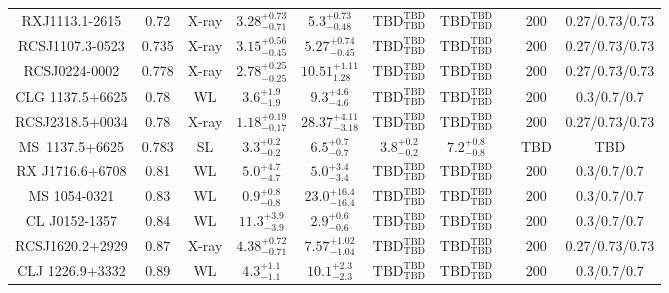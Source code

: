 \begin{table}
\begin{tabular}{cccccccccc}
RXJ1113.1-2615 & 0.72 & X-ray & ${3.28}^{+0.73}_{-0.71}$ & ${5.3}^{+0.73}_{-0.48}$ & ${\mathrm{TBD}}^{\mathrm{TBD}}_{\mathrm{TBD}}$ & ${\mathrm{TBD}}^{\mathrm{TBD}}_{\mathrm{TBD}}$ & \citet{BA14.1} & 200 & 0.27/0.73/0.73 \\
RCSJ1107.3-0523 & 0.735 & X-ray & ${3.15}^{+0.56}_{-0.45}$ & ${5.27}^{+0.74}_{-0.45}$ & ${\mathrm{TBD}}^{\mathrm{TBD}}_{\mathrm{TBD}}$ & ${\mathrm{TBD}}^{\mathrm{TBD}}_{\mathrm{TBD}}$ & \citet{BA14.1} & 200 & 0.27/0.73/0.73 \\
RCSJ0224-0002 & 0.778 & X-ray & ${2.78}^{+0.25}_{-0.25}$ & ${10.51}^{+1.11}_{1.28}$ & ${\mathrm{TBD}}^{\mathrm{TBD}}_{\mathrm{TBD}}$ & ${\mathrm{TBD}}^{\mathrm{TBD}}_{\mathrm{TBD}}$ & \citet{BA14.1} & 200 & 0.27/0.73/0.73 \\
CLG 1137.5+6625 & 0.78 & WL & ${3.6}^{+1.9}_{-1.9}$ & ${9.3}^{+4.6}_{-4.6}$ & ${\mathrm{TBD}}^{\mathrm{TBD}}_{\mathrm{TBD}}$ & ${\mathrm{TBD}}^{\mathrm{TBD}}_{\mathrm{TBD}}$ & \citet{SE14.1} & 200 & 0.3/0.7/0.7 \\
RCSJ2318.5+0034 & 0.78 & X-ray & ${1.18}^{+0.19}_{-0.17}$ & ${28.37}^{+4.11}_{-3.18}$ & ${\mathrm{TBD}}^{\mathrm{TBD}}_{\mathrm{TBD}}$ & ${\mathrm{TBD}}^{\mathrm{TBD}}_{\mathrm{TBD}}$ & \citet{BA14.1} & 200 & 0.27/0.73/0.73 \\
MS~1137.5+6625 & 0.783 & SL & ${3.3}^{+0.2}_{-0.2}$ & ${6.5}^{+0.7}_{-0.7}$ & ${3.8}^{+0.2}_{-0.2}$ & ${7.2}^{+0.8}_{-0.8}$ & \citet{CO07.1} & TBD & TBD \\
RX J1716.6+6708 & 0.81 & WL & ${5.0}^{+4.7}_{-4.7}$ & ${5.0}^{+3.4}_{-3.4}$ & ${\mathrm{TBD}}^{\mathrm{TBD}}_{\mathrm{TBD}}$ & ${\mathrm{TBD}}^{\mathrm{TBD}}_{\mathrm{TBD}}$ & \citet{SE14.1} & 200 & 0.3/0.7/0.7 \\
MS 1054-0321 & 0.83 & WL & ${0.9}^{+0.8}_{-0.8}$ & ${23.0}^{+16.4}_{-16.4}$ & ${\mathrm{TBD}}^{\mathrm{TBD}}_{\mathrm{TBD}}$ & ${\mathrm{TBD}}^{\mathrm{TBD}}_{\mathrm{TBD}}$ & \citet{SE14.1} & 200 & 0.3/0.7/0.7 \\
CL J0152-1357 & 0.84 & WL & ${11.3}^{+3.9}_{-3.9}$ & ${2.9}^{+0.6}_{-0.6}$ & ${\mathrm{TBD}}^{\mathrm{TBD}}_{\mathrm{TBD}}$ & ${\mathrm{TBD}}^{\mathrm{TBD}}_{\mathrm{TBD}}$ & \citet{SE14.1} & 200 & 0.3/0.7/0.7 \\
RCSJ1620.2+2929 & 0.87 & X-ray & ${4.38}^{+0.72}_{-0.71}$ & ${7.57}^{+1.02}_{-1.04}$ & ${\mathrm{TBD}}^{\mathrm{TBD}}_{\mathrm{TBD}}$ & ${\mathrm{TBD}}^{\mathrm{TBD}}_{\mathrm{TBD}}$ & \citet{BA14.1} & 200 & 0.27/0.73/0.73 \\
CLJ 1226.9+3332 & 0.89 & WL & ${4.3}^{+1.1}_{-1.1}$ & ${10.1}^{+2.3}_{-2.3}$ & ${\mathrm{TBD}}^{\mathrm{TBD}}_{\mathrm{TBD}}$ & ${\mathrm{TBD}}^{\mathrm{TBD}}_{\mathrm{TBD}}$ & \citet{SE14.1} & 200 & 0.3/0.7/0.7 \\

\end{tabular}
\end{table}

